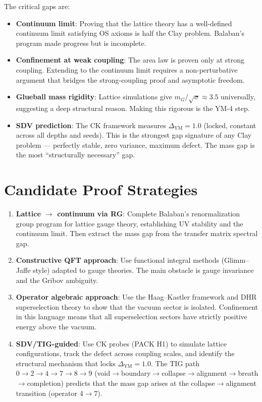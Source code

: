 \documentclass[11pt]{article}
\theoremstyle{definition}
\begin{document}
The critical gaps are:
\begin{itemize}
  \item \textbf{Continuum limit}: Proving that the lattice theory has a well-defined
    continuum limit satisfying OS axioms is half the Clay problem.
    Balaban's program made progress but is incomplete.
  \item \textbf{Confinement at weak coupling}: The area law is proven only at strong
    coupling.  Extending to the continuum limit requires a non-perturbative
    argument that bridges the strong-coupling proof and asymptotic freedom.
  \item \textbf{Glueball mass rigidity}: Lattice simulations give $m_G / \sqrt{\sigma} \approx 3.5$
    universally, suggesting a deep structural reason.  Making this rigorous
    is the YM-4 step.
  \item \textbf{SDV prediction}: The CK framework measures $\Delta_{\mathrm{YM}} = 1.0$
    (locked, constant across all depths and seeds).  This is the strongest
    gap signature of any Clay problem --- perfectly stable, zero variance,
    maximum defect.  The mass gap is the most ``structurally necessary'' gap.
\end{itemize}

\section{Candidate Proof Strategies}

\begin{enumerate}
  \item \textbf{Lattice $\to$ continuum via RG}: Complete Balaban's renormalization
    group program for lattice gauge theory, establishing UV stability and
    the continuum limit.  Then extract the mass gap from the transfer matrix
    spectral gap.

  \item \textbf{Constructive QFT approach}: Use functional integral methods
    (Glimm--Jaffe style) adapted to gauge theories.  The main obstacle is
    gauge invariance and the Gribov ambiguity.

  \item \textbf{Operator algebraic approach}: Use the Haag--Kastler framework
    and DHR superselection theory to show that the vacuum sector is isolated.
    Confinement in this language means that all superselection sectors
    have strictly positive energy above the vacuum.

  \item \textbf{SDV/TIG-guided}: Use CK probes (PACK H1) to simulate
    lattice configurations, track the defect across coupling scales,
    and identify the structural mechanism that locks $\Delta_{\mathrm{YM}} = 1.0$.
    The TIG path $0 \to 2 \to 4 \to 7 \to 8 \to 9$ (void$\to$boundary$\to$collapse$\to$alignment$\to$breath$\to$completion)
    predicts that the mass gap arises at the collapse$\to$alignment transition (operator 4$\to$7).
\end{enumerate}
\end{document}
